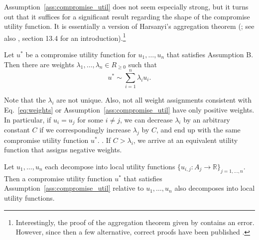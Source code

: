 Assumption~\ref{ass:compromise_util} does not seem especially strong, but it turns out that it
suffices for a significant result regarding the shape of the compromise utility function. It is
essentially a version of Harsanyi's aggregation theorem (\cite{Harsanyi1955-ou}; see also
\cite{Peterson2017-pa}, section 13.4 for an introduction).\footnote{Interestingly, the proof of the
    aggregation theorem given by \citet{Harsanyi1955-ou} contains an error. However, since then
    a few alternative, correct proofs have been published
    \parencite{Fishburn1984-zh,Border1985-mw,Hammond_undated-bp}.}

\begin{theorem}
\parencite{Resnik1983-hl,Fishburn1984-zh} Let \(u^{*}\) be
a compromise utility function for \(u_{1},\dotsc,u_{n}\) that satisfies
Assumption B. Then there are weights
\(\lambda_{1},\dotsc,\lambda_{n} \in R_{\geq 0}\) such that
\begin{equation}
    u^{*} \sim \sum_{i=1}^n\lambda_{i}u_{i}.
    \label{eq:weights}
\end{equation}
    \label{th:compromise}
\end{theorem}

Note that the \(\lambda_{i}\) are not unique. Also, not all weight
assignments consistent with Eq.~\eqref{eq:weights} or Assumption~\ref{ass:compromise_util} have only positive
weights. In particular, if \(u_{i} = u_{j}\) for some \(i \neq j\), we
can decrease \(\lambda_{i}\) by an arbitrary constant \(C\) if we
correspondingly increase \(\lambda_{j}\) by \(C\), and end up with the
same compromise utility function \(u^*\).
\parencite{Resnik1983-hl,Fishburn1984-zh}. If
\(C > \lambda_{i}\), we arrive at an equivalent utility function that
assigns negative weights.


\begin{theorem}
Let \(u_{1},\dotsc,u_{n}\) each decompose into local utility functions \(\{{ u}_{i,j}\colon A_{j} \rightarrow
\mathbb{R}\}_{j = 1,\dotsc,n}\).  Then a compromise utility function \(u^{*}\) that satisfies
Assumption~\ref{ass:compromise_util} relative to \(u_{1},\dotsc,u_{n}\) also decomposes into local
utility functions.
    \label{th:decompose}
\end{theorem}

